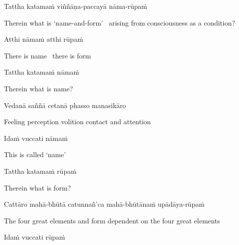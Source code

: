 Tattha katamaṁ viññāṇa-paccayā nāma-rūpaṁ

\begin{english-hang}
  Therein what is `name-and-form' \breathmark\ arising from consciousness as a condition?
\end{english-hang}

Atthi nāmaṁ atthi rūpaṁ

\begin{english}
  There is name \breathmark\ there is form
\end{english}

Tattha katamaṁ nāmaṁ

\begin{english}
  Therein what is name?
\end{english}

Vedanā saññā cetanā phasso manasikāro\makeatletter\hyperlink{endnote80-appendix}\makeatother

\begin{english}
  Feeling perception volition contact and attention
\end{english}

Idaṁ vuccati nāmaṁ

\begin{english}
  This is called `name'
\end{english}

Tattha katamaṁ rūpaṁ

\begin{english}
  Therein what is form?
\end{english}

Cattāro mahā-bhūtā catunnañ'ca mahā-bhūtānaṁ upādāya-rūpaṁ

\begin{english-hang}
  The four great elements and form dependent on the four great elements
\end{english-hang}

Idaṁ vuccati rūpaṁ

